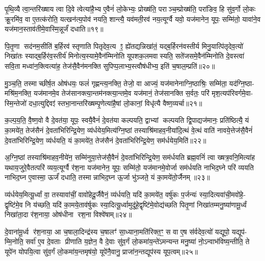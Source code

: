 {\anuvakamend[{जु॒षे॒ सते॑जस॒मन॑ख्षसङ्गं बहुशा॒खं वृ॑श्चेदे॒ष वै य॒ज्ञ उपै॑न॒मुत्त॑रो य॒ज्ञ आप्त्या॒ एका॒न्नविꣳ॑श॒तिश्च॑॥३॥}]}

पृ॒थि॒व्यै त्वा॒न्तरि॑ख्षाय त्वा दि॒वे त्वेत्या॑है॒भ्य ए॒वैनं॑ लो॒केभ्यः॒ प्रोख्ष॑ति॒ पराञ्च॒म्प्रोख्ष॑ति॒ परा॑ङिव॒ हि सु॑व॒र्गो लो॒कः क्रू॒रमि॑व॒ वा ए॒तत्क॑रोति॒ यत्खन॑त्य॒पोव॑ नयति॒ शान्त्यै॒ यव॑मती॒रव॑ नय॒त्यूर्ग्वै यवो॒ यज॑मानेन॒ यूपः॒ सम्मि॑तो॒ यावा॑ने॒व यज॑मान॒स्ताव॑तीमे॒वास्मि॒न्नूर्जं॑ दधाति॥१९॥

पि॒तृ॒णा सद॑नम॒सीति॑ ब॒र्\mbox{}हिरव॑ स्तृणाति पितृदेव॒त्य ꣵ॒ ह्ये॑तद्यन्निखा॑तं॒ यद्ब॒र्\mbox{}हिरन॑वस्तीर्य मिनु॒यात्पि॑तृदेव॒त्यो॑ निखा॑तः स्याद्ब॒र्\mbox{}हिर॑व॒स्तीर्य॑ मिनोत्य॒स्यामे॒वैन॑म्मिनोति यूपशक॒लमवास्यति॒ सते॑जसमे॒वैन॑म्मिनोति दे॒वस्त्वा॑ सवि॒ता मध्वा॑न॒क्त्वित्या॑ह॒ तेज॑सै॒वैन॑मनक्ति सुपिप्प॒लाभ्य॒स्त्वौष॑धीभ्य॒ इति॑ च॒षाल॒म्प्रति॑॥२०॥

मु॒ञ्च॒ति॒ तस्माच्छीर्\mbox{}ष॒त ओष॑धयः॒ फलं॑ गृह्णन्त्य॒नक्ति॒ तेजो॒ वा आज्यं॒ यज॑मानेनाग्नि॒ष्ठाश्रिः॒ सम्मि॑ता॒ यद॑ग्नि॒ष्ठा- मश्रि॑म॒नक्ति॒ यज॑मानमे॒व तेज॑सानक्त्या॒न्तम॑नक्त्या॒न्तमे॒व यज॑मानं॒ तेज॑सानक्ति स॒र्वतः॒ परि॑ मृश॒त्यप॑रिवर्गमे॒वा- स्मि॒न्तेजो॑ दधा॒त्युद्दिवꣵ॑ स्तभा॒नान्तरि॑ख्षम्पृ॒णेत्या॑है॒षां लो॒कानां॒ विधृ॑त्यै वैष्ण॒व्यर्चा॥२१॥

क॒ल्प॒य॒ति॒ वै॒ष्ण॒वो वै दे॒वत॑या॒ यूपः॒ स्वयै॒वैनं॑ दे॒वत॑या कल्पयति॒ द्वाभ्यां कल्पयति द्वि॒पाद्यज॑मानः॒ प्रति॑ष्ठित्यै॒ यं का॒मये॑त॒ तेज॑सैनं दे॒वता॑भिरिन्द्रि॒येण॒ व्य॑र्धयेय॒मित्य॑ग्नि॒ष्ठां तस्याश्रि॑माहव॒नीया॑दि॒त्थं वे॒त्थं वाति॑ नावये॒त्तेज॑सै॒वैनं॑ दे॒वता॑भिरिन्द्रि॒येण॒ व्य॑र्धयति॒ यं का॒मये॑त॒ तेज॑सैनं दे॒वता॑भिरिन्द्रि॒येण॒ सम॑र्धयेय॒मिति॑॥२२॥

अ॒ग्नि॒ष्ठां तस्याश्रि॑माहव॒नीये॑न॒ सम्मि॑नुया॒त्तेज॑सै॒वैनं॑ दे॒वता॑भिरिन्द्रि॒येण॒ सम॑र्धयति ब्रह्म॒वनिं॑ त्वा ख्षत्र॒वनि॒मित्या॑ह यथाय॒जुरे॒वैतत्परि॑ व्यय॒त्यूर्ग्वै र॑श॒ना यज॑मानेन॒ यूपः॒ सम्मि॑तो॒ यज॑मानमे॒वोर्जा सम॑र्धयति नाभिद॒घ्ने परि॑ व्ययति नाभिद॒घ्न ए॒वास्मा॒ ऊर्जं॑ दधाति॒ तस्मान्नाभिद॒घ्न ऊ॒र्जा भु॑ञ्जते॒ यं का॒मये॑तो॒र्जैनम्॥२३॥

व्य॑र्धयेय॒मित्यू॒र्ध्वां वा॒ तस्यावा॑चीं॒ वावो॑हेदू॒र्जैवैनं॒ व्य॑र्धयति॒ यदि॑ का॒मये॑त॒ वर्\mbox{}षु॑कः प॒र्जन्यः॑ स्या॒दित्यवा॑ची॒मवो॑हे॒- द्वृष्टि॑मे॒व नि य॑च्छति॒ यदि॑ का॒मये॒ताव॑र्\mbox{}षुकः स्या॒दित्यू॒र्ध्वामुदू॑हे॒द्वृष्टि॑मे॒वोद्य॑च्छति पितृ॒णां निखा॑तम्मनु॒ष्या॑णामू॒र्ध्वं निखा॑ता॒दा र॑श॒नाया॒ ओष॑धीना रश॒ना विश्वे॑षाम्॥२४॥

दे॒वाना॑मू॒र्ध्व र॑श॒नाया॒ आ च॒षाला॒दिन्द्र॑स्य च॒षालꣳ॑ सा॒ध्याना॒मति॑रिक्त॒ꣳ॒ स वा ए॒ष स॑र्वदेव॒त्यो॑ यद्यूपो॒ यद्यूप॑- म्मि॒नोति॒ सर्वा॑ ए॒व दे॒वताः प्रीणाति य॒ज्ञेन॒ वै दे॒वाः सु॑व॒र्गं लो॒कमा॑य॒न्ते॑ऽमन्यन्त मनु॒ष्या॑ नो॒ऽन्वाभ॑विष्य॒न्तीति॒ ते यूपे॑न योपयि॒त्वा सु॑व॒र्गं लो॒कमा॑य॒न्तमृष॑यो॒ यूपे॑नै॒वानु॒ प्राजा॑न॒न्तद्यूप॑स्य यूप॒त्वम्॥२५॥

